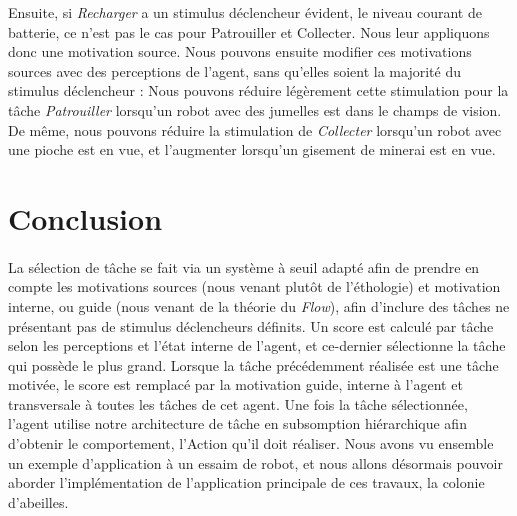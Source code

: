 		Ensuite, si \textit{Recharger} a un stimulus déclencheur évident, le niveau courant de batterie, ce n'est pas le cas pour Patrouiller et Collecter. Nous leur appliquons donc une motivation source. Nous pouvons ensuite modifier ces motivations sources avec des perceptions de l'agent, sans qu'elles soient la majorité du stimulus déclencheur : Nous pouvons réduire légèrement cette stimulation pour la tâche \textit{Patrouiller} lorsqu'un robot avec des jumelles est dans le champs de vision. De même, nous pouvons réduire la stimulation de \textit{Collecter} lorsqu'un robot avec une pioche est en vue, et l'augmenter lorsqu'un gisement de minerai est en vue.
			
			
				
	\section*{Conclusion}
		\paragraph{}
		La sélection de tâche se fait via un système à seuil adapté afin de prendre en compte les motivations sources (nous venant plutôt de l'éthologie) et motivation interne, ou guide (nous venant de la théorie du \textit{Flow}), afin d'inclure des tâches ne présentant pas de stimulus déclencheurs définits. Un score est calculé par tâche selon les perceptions et l'état interne de l'agent, et ce-dernier sélectionne la tâche qui possède le plus grand. Lorsque la tâche précédemment réalisée est une tâche motivée, le score est remplacé par la motivation guide, interne à l'agent et transversale à toutes les tâches de cet agent. Une fois la tâche sélectionnée, l'agent utilise notre architecture de tâche en subsomption hiérarchique afin d'obtenir le comportement, l'Action qu'il doit réaliser. Nous avons vu ensemble un exemple d'application à un essaim de robot, et nous allons désormais pouvoir aborder l'implémentation de l'application principale de ces travaux, la colonie d'abeilles.
